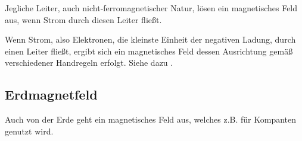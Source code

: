 Jegliche Leiter, auch nicht-ferromagnetischer Natur, lösen ein magnetisches Feld aus, wenn Strom durch diesen Leiter fließt.

Wenn Strom, also Elektronen, die kleinste Einheit der negativen Ladung, durch einen Leiter fließt, ergibt sich ein magnetisches Feld dessen Ausrichtung gemäß verschiedener Handregeln erfolgt. Siehe dazu .


\subsection{Erdmagnetfeld}

Auch von der Erde geht ein magnetisches Feld aus, welches z.B. für Kompanten genutzt wird.

